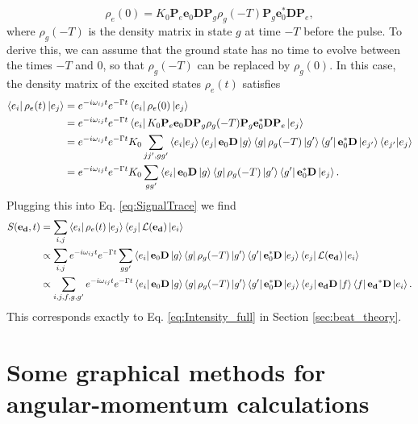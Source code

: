 \documentclass[11pt]{article}
\newcommand{\lag}{\mathcal{L}}
\begin{document}
\begin{appendices}
\begin{equation}
\rho_e(0) = K_0 \mathbf{P}_e \mathbf{e}_0 \mathbf{D} \mathbf{P}_g \rho_g(-T) \mathbf{P}_g \mathbf{e}_0^* \mathbf{D} \mathbf{P}_e,
\end{equation}
where $\rho_g(-T)$ is the density matrix in state $g$ at time $-T$ before the pulse. To derive this, we can assume that the ground state has no time to evolve between the times $-T$ and $0$, so that $\rho_g(-T)$ can be replaced by $\rho_g(0)$. In this case, the density matrix of the excited states $\rho_e(t)$ satisfies
\begin{align*}
\bra{e_i} \rho_e(t) \ket{e_j} 
&= e^{-i\omega_{ij}t} e^{-\Gamma t} \bra{e_i} \rho_e(0) \ket{e_j} \nonumber\\
&= e^{-i\omega_{ij}t} e^{-\Gamma t} \bra{e_i} K_0 \mathbf{P}_e \mathbf{e}_0 \mathbf{D} \mathbf{P}_g \rho_g(-T) \mathbf{P}_g \mathbf{e}_0^* \mathbf{D} \mathbf{P}_e \ket{e_j} \nonumber \\
&= e^{-i\omega_{ij}t} e^{-\Gamma t} K_0  \sum_{jj',gg'} \bra{e_i}\ket{e_j}\bra{e_j}\mathbf{e}_0 \mathbf{D} \ket{g}\bra{g} \rho_g(-T) \ket{g'}\bra{g'} \mathbf{e}_0^* \mathbf{D} \ket{e_{j'}}\bra{e_{j'}}\ket{e_j} \\
&= e^{-i\omega_{ij}t} e^{-\Gamma t} K_0  \sum_{gg'} \bra{e_i}\mathbf{e}_0 \mathbf{D} \ket{g}\bra{g} \rho_g(-T) \ket{g'}\bra{g'} \mathbf{e}_0^* \mathbf{D} \ket{e_{j}}.
\end{align*}
Plugging this into Eq. \ref{eq:SignalTrace} we find 
\begin{align}\label{eq:signal_full}
S(\mathbf{e_d},t) &= \sum_{i,j} \bra{e_i}\rho_e(t)\ket{e_j} \bra{e_j}\lag(\mathbf{e_d}) \ket{e_i} \nonumber\\
&\propto \sum_{i,j} e^{-i\omega_{ij}t} e^{-\Gamma t} \sum_{gg'} \bra{e_i}\mathbf{e}_0 \mathbf{D} \ket{g}\bra{g} \rho_g(-T) \ket{g'}\bra{g'} \mathbf{e}_0^* \mathbf{D} \ket{e_{j}} \bra{e_j}\lag(\mathbf{e_d}) \ket{e_i} \nonumber\\
&\propto \sum_{i,j,f,g,g'} e^{-i\omega_{ij}t} e^{-\Gamma t}  \bra{e_i}\mathbf{e}_0 \mathbf{D} \ket{g}\bra{g} \rho_g(-T) \ket{g'}\bra{g'} \mathbf{e}_0^* \mathbf{D} \ket{e_{j}} \bra{e_j}\mathbf{e_d} \mathbf{D}\ket{f}\bra{f}\mathbf{e_d}^* \mathbf{D} \ket{e_i}.
\end{align} 
This corresponds exactly to Eq. \ref{eq:Intensity_full} in Section \ref{sec:beat_theory}.







\section{Some graphical methods for angular-momentum calculations \cite{angular_momentum}}\label{app:angular_momentum}



\end{appendices}
\end{document}
